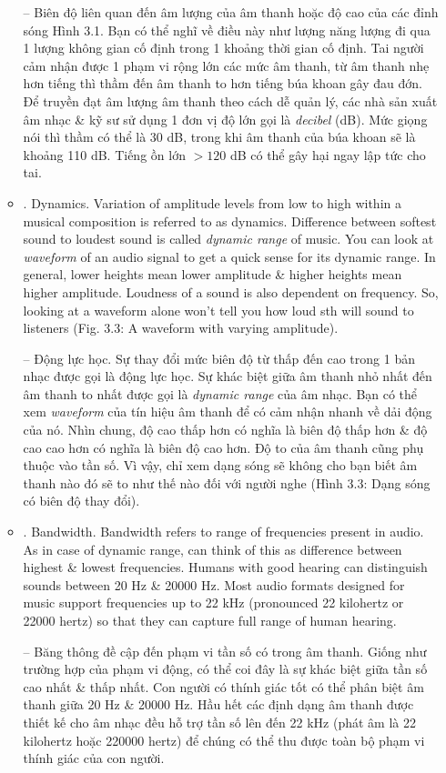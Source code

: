 \documentclass{article}
\begin{document}
\begin{itemize}
\begin{itemize}
		-- Biên độ liên quan đến âm lượng của âm thanh hoặc độ cao của các đỉnh sóng Hình 3.1. Bạn có thể nghĩ về điều này như lượng năng lượng đi qua 1 lượng không gian cố định trong 1 khoảng thời gian cố định. Tai người cảm nhận được 1 phạm vi rộng lớn các mức âm thanh, từ âm thanh nhẹ hơn tiếng thì thầm đến âm thanh to hơn tiếng búa khoan gây đau đớn. Để truyền đạt âm lượng âm thanh theo cách dễ quản lý, các nhà sản xuất âm nhạc \& kỹ sư sử dụng 1 đơn vị độ lớn gọi là {\it decibel} (dB). Mức giọng nói thì thầm có thể là 30 dB, trong khi âm thanh của búa khoan sẽ là khoảng 110 dB. Tiếng ồn lớn $> 120$ dB có thể gây hại ngay lập tức cho tai.
		\item {. Dynamics.} Variation of amplitude levels from low to high within a musical composition is referred to as dynamics. Difference between softest sound to loudest sound is called {\it dynamic range} of music. You can look at {\it waveform} of an audio signal to get a quick sense for its dynamic range. In general, lower heights mean lower amplitude \& higher heights mean higher amplitude. Loudness of a sound is also dependent on frequency. So, looking at a waveform alone won't tell you how loud sth will sound to listeners ({\sf Fig. 3.3: A waveform with varying amplitude}).
		
		-- {\sf Động lực học.} Sự thay đổi mức biên độ từ thấp đến cao trong 1 bản nhạc được gọi là động lực học. Sự khác biệt giữa âm thanh nhỏ nhất đến âm thanh to nhất được gọi là {\it dynamic range} của âm nhạc. Bạn có thể xem {\it waveform} của tín hiệu âm thanh để có cảm nhận nhanh về dải động của nó. Nhìn chung, độ cao thấp hơn có nghĩa là biên độ thấp hơn \& độ cao cao hơn có nghĩa là biên độ cao hơn. Độ to của âm thanh cũng phụ thuộc vào tần số. Vì vậy, chỉ xem dạng sóng sẽ không cho bạn biết âm thanh nào đó sẽ to như thế nào đối với người nghe ({\sf Hình 3.3: Dạng sóng có biên độ thay đổi}).
		\item {. Bandwidth.} Bandwidth refers to range of frequencies present in audio. As in case of dynamic range, can think of this as difference between highest \& lowest frequencies. Humans with good hearing can distinguish sounds between 20 Hz \& 20000 Hz. Most audio formats designed for music support frequencies up to 22 kHz (pronounced 22 kilohertz or 22000 hertz) so that they can capture full range of human hearing.
		
		-- Băng thông đề cập đến phạm vi tần số có trong âm thanh. Giống như trường hợp của phạm vi động, có thể coi đây là sự khác biệt giữa tần số cao nhất \& thấp nhất. Con người có thính giác tốt có thể phân biệt âm thanh giữa 20 Hz \& 20000 Hz. Hầu hết các định dạng âm thanh được thiết kế cho âm nhạc đều hỗ trợ tần số lên đến 22 kHz (phát âm là 22 kilohertz hoặc 220000 hertz) để chúng có thể thu được toàn bộ phạm vi thính giác của con người.
		

\end{itemize}
\end{itemize}
\end{document}
